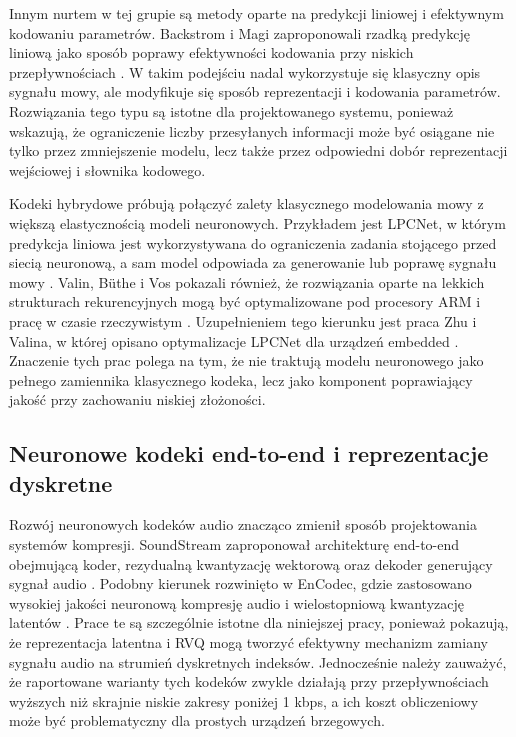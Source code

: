 Innym nurtem w tej grupie są metody oparte na predykcji liniowej i efektywnym kodowaniu parametrów. Backstrom i Magi zaproponowali rzadką predykcję liniową jako sposób poprawy efektywności kodowania przy niskich przepływnościach \cite{Backstrom2017SparseLinearPrediction}. W takim podejściu nadal wykorzystuje się klasyczny opis sygnału mowy, ale modyfikuje się sposób reprezentacji i kodowania parametrów. Rozwiązania tego typu są istotne dla projektowanego systemu, ponieważ wskazują, że ograniczenie liczby przesyłanych informacji może być osiągane nie tylko przez zmniejszenie modelu, lecz także przez odpowiedni dobór reprezentacji wejściowej i słownika kodowego.

Kodeki hybrydowe próbują połączyć zalety klasycznego modelowania mowy z większą elastycznością modeli neuronowych. Przykładem jest LPCNet, w którym predykcja liniowa jest wykorzystywana do ograniczenia zadania stojącego przed siecią neuronową, a sam model odpowiada za generowanie lub poprawę sygnału mowy \cite{Valin2019LPCNet}. Valin, Büthe i Vos pokazali również, że rozwiązania oparte na lekkich strukturach rekurencyjnych mogą być optymalizowane pod procesory ARM i pracę w czasie rzeczywistym \cite{Valin2022UltraLowLatencySpeechEnhancement}. Uzupełnieniem tego kierunku jest praca Zhu i Valina, w której opisano optymalizacje LPCNet dla urządzeń embedded \cite{Zhu2021OptimizingLPCNet}. Znaczenie tych prac polega na tym, że nie traktują modelu neuronowego jako pełnego zamiennika klasycznego kodeka, lecz jako komponent poprawiający jakość przy zachowaniu niskiej złożoności.

\subsection{Neuronowe kodeki end-to-end i reprezentacje dyskretne}
\label{subsec:neuronowe-kodeki-reprezentacje-dyskretne}

Rozwój neuronowych kodeków audio znacząco zmienił sposób projektowania systemów kompresji. SoundStream zaproponował architekturę end-to-end obejmującą koder, rezydualną kwantyzację wektorową oraz dekoder generujący sygnał audio \cite{Zeghidour2021SoundStream}. Podobny kierunek rozwinięto w EnCodec, gdzie zastosowano wysokiej jakości neuronową kompresję audio i wielostopniową kwantyzację latentów \cite{Defossez2022Encodec}. Prace te są szczególnie istotne dla niniejszej pracy, ponieważ pokazują, że reprezentacja latentna i RVQ mogą tworzyć efektywny mechanizm zamiany sygnału audio na strumień dyskretnych indeksów. Jednocześnie należy zauważyć, że raportowane warianty tych kodeków zwykle działają przy przepływnościach wyższych niż skrajnie niskie zakresy poniżej 1 kbps, a ich koszt obliczeniowy może być problematyczny dla prostych urządzeń brzegowych.


